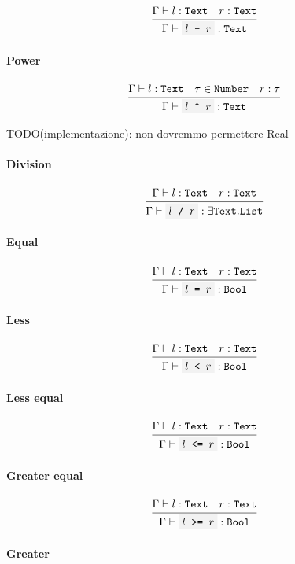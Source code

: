 \documentclass[11pt]{report}
\newcommand{\infrule}[3][gathered]{\frac{\begin{#1}#2\end{#1}}{\begin{gathered}#3\end{gathered}}}
\newcommand{\then}{\vdash}
\newcommand{\code}[1]{\texttt{\colorbox{gray!10}{#1}}}
\newcommand{\Bool}{\texttt{Bool}}
\newcommand{\Text}{\texttt{Text}}
\newcommand{\List}{\texttt{List}}
\newcommand{\Env}{\Gamma}
\theoremstyle{definition}
\newcommand{\comment}[1]{
	\parbox{0.9\linewidth}{\color{black!30}\small\sffamily #1}
}
\begin{document}
\[
	\infrule{
		\Env\then l:\Text \quad r:\Text
	}{
		\Env\then \code{$l$ - $r$}: \Text
	}
\]

\paragraph{Power}

\[
	\infrule{
		\Env\then l:\Text \quad \tau \in \texttt{Number} \quad r:\tau
	}{
		\Env\then \code{$l$ \^{} $r$}: \Text
	}
\]

\comment{TODO(implementazione): non dovremmo permettere Real}

\paragraph{Division}

\[
	\infrule{
		\Env\then l:\Text \quad r:\Text
	}{
		\Env\then \code{$l$ / $r$}: \exists\Text.\List
	}
\]

\paragraph{Equal}

\[
	\infrule{
		\Env\then l:\Text \quad r:\Text
	}{
		\Env\then \code{$l$ = $r$}: \Bool
	}
\]

\paragraph{Less}

\[
	\infrule{
		\Env\then l:\Text \quad r:\Text
	}{
		\Env\then \code{$l$ < $r$}: \Bool
	}
\]

\paragraph{Less equal}

\[
	\infrule{
		\Env\then l:\Text \quad r:\Text
	}{
		\Env\then \code{$l$ <= $r$}: \Bool
	}
\]

\paragraph{Greater equal}

\[
	\infrule{
		\Env\then l:\Text \quad r:\Text
	}{
		\Env\then \code{$l$ >= $r$}: \Bool
	}
\]

\paragraph{Greater}
\end{document}

